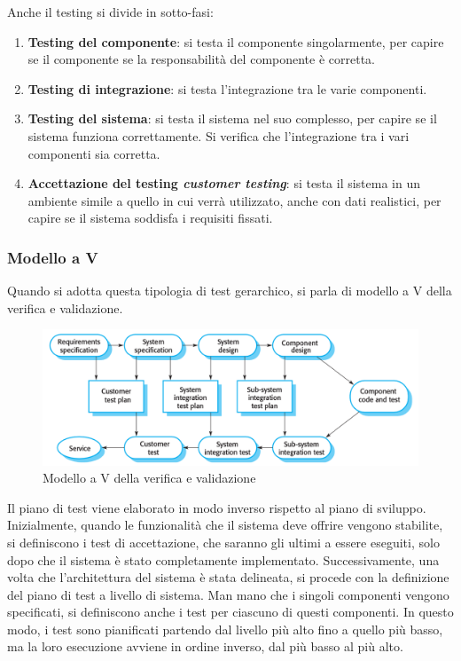 Anche il testing si divide in sotto-fasi:
\begin{enumerate}
    \item \textbf{Testing del componente}: si testa il componente singolarmente,
    per capire se il componente se la responsabilità del componente è corretta.
    \item \textbf{Testing di integrazione}: si testa l'integrazione tra le varie componenti.
    \item \textbf{Testing del sistema}: si testa il sistema nel suo complesso,
    per capire se il sistema funziona correttamente. Si verifica che l'integrazione 
    tra i vari componenti sia corretta.
    \item \textbf{Accettazione del testing \textit{customer testing}}: si testa il sistema
    in un ambiente simile a quello in cui verrà utilizzato, anche con 
    dati realistici, per capire se il sistema
    soddisfa i requisiti fissati.
\end{enumerate}
\subsubsection{Modello a V}
Quando si adotta questa tipologia di test gerarchico, si parla di modello a V della 
verifica e validazione.
\begin{figure}[H]
    \centering
    \includegraphics[scale=0.3]{img/validation.png}
    \caption{Modello a V della verifica e validazione}
\end{figure}
Il piano di test viene elaborato in modo inverso rispetto al piano di sviluppo.
Inizialmente, quando le funzionalità che il sistema deve offrire vengono stabilite,
si definiscono i test di accettazione, che saranno gli ultimi a essere eseguiti,
solo dopo che il sistema è stato completamente implementato. Successivamente, una
volta che l'architettura del sistema è stata delineata, si procede con la definizione
del piano di test a livello di sistema. Man mano che i singoli componenti vengono
specificati, si definiscono anche i test per ciascuno di questi componenti. In
questo modo, i test sono pianificati partendo dal livello più alto fino a quello
più basso,
ma la loro esecuzione avviene in ordine inverso, dal più basso al più alto.
